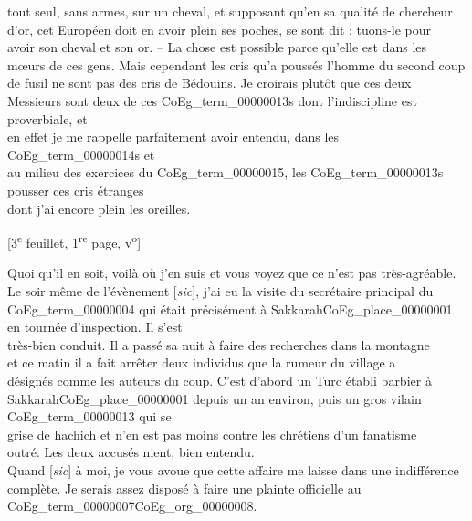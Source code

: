\documentclass{book}
\begin{document}
tout seul, sans armes, sur un cheval, et supposant qu’en sa qualité de chercheur\\
d’or, cet Européen doit en avoir plein ses poches, se sont dit : tuons-le pour\\
avoir son cheval et son or. – La chose est possible parce qu’elle est dans les\\
mœurs de ces gens. Mais cependant les cris qu’a poussés l’homme du second coup\\
de fusil ne sont pas des cris de Bédouins. Je croirais plutôt que ces deux\\
Messieurs sont deux de ces \glspl{CoEg_term_00000013} dont l’indiscipline est proverbiale, et\\
en effet je me rappelle parfaitement avoir entendu, dans les \glspl{CoEg_term_00000014} et\\
au milieu des exercices du \gls{CoEg_term_00000015}, les \Glspl{CoEg_term_00000013} pousser ces cris étranges\\
dont j’ai encore plein les oreilles.
{\footnotesize\begin{center} {[3\textsuperscript{e} feuillet, 1\textsuperscript{re} page, v\textsuperscript{o}]}\end{center}}
\indent Quoi qu’il en soit, voilà où j’en suis et vous voyez que ce n’est pas très-agréable.\\
\indent Le soir même de l’évènement {[\textit{sic}]}, j’ai eu la visite du secrétaire principal du\\
\Gls{CoEg_term_00000004} qui était précisément à Sakkarah\gls{CoEg_place_00000001} en tournée d’inspection. Il s’est\\
très-bien conduit. Il a passé sa nuit à faire des recherches dans la montagne\\
et ce matin il a fait arrêter deux individus que la rumeur du village a\\
désignés comme les auteurs du coup. C’est d’abord un Turc établi barbier à\\
Sakkarah\gls{CoEg_place_00000001} depuis un an environ, puis un gros vilain \Gls{CoEg_term_00000013} qui se\\
grise de hachich et n’en est pas moins contre les chrétiens d’un fanatisme\\
outré. Les deux accusés nient, bien entendu.\\
\indent Quand {[\textit{sic}]} à moi, je vous avoue que cette affaire me laisse dans une indifférence\\
complète. Je serais assez disposé à faire une plainte officielle au \gls{CoEg_term_00000007}\gls{CoEg_org_00000008}.\\
\end{document}
